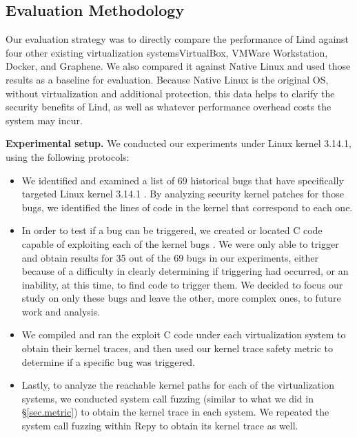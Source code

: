 \subsection{Evaluation Methodology}

Our evaluation strategy was to directly compare the performance of Lind
against
four other existing virtualization systems\textendash VirtualBox, VMWare
Workstation,
Docker, and Graphene. We also compared it against Native Linux and used
those results as a baseline for evaluation. Because Native Linux is the
original OS,
without virtualization and additional protection, this data helps to
clarify the security benefits of Lind,
as well as whatever performance overhead costs the system may incur.

\textbf{Experimental setup.}
We conducted our experiments under Linux kernel 3.14.1, using the following
protocols:

\begin{itemize}
\item We identified and examined a list of  69 historical bugs that have
specifically
targeted Linux kernel 3.14.1 \cite{CVE-Datasource}. By analyzing
security kernel patches for those bugs,
we identified the lines of code in the kernel that correspond to each
one.

\item In order to test if a bug can be triggered, we created or located C
code capable of exploiting each of the kernel bugs \cite{Exploit-Database}.
We were only able to trigger and obtain results for
35 out of the 69 bugs in our experiments, either because of a difficulty in
clearly determining if triggering had occurred, or an inability,
at this time, to find code to trigger them. We decided to focus our study on
only these bugs and leave the other, more complex ones, to future work and analysis.

\item We compiled and ran the exploit C code under each virtualization
system to
obtain their kernel traces, and then used our kernel trace safety metric to
determine
if a specific bug was triggered.

\item Lastly, to analyze the reachable kernel paths for each of the
virtualization systems,
we conducted system call fuzzing (similar to what we did in \S{\ref{sec.metric}}) to obtain
the kernel trace in each system.
We repeated the system call fuzzing within Repy to obtain its
kernel trace as well.
\end{itemize}

